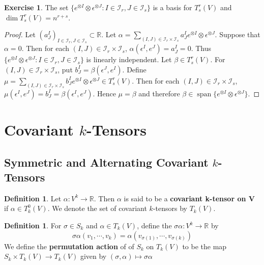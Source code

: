 \documentclass{book}
\theoremstyle{definition}
\newtheorem{defn}[definition]{Definition}
\newtheorem{ex}[definition]{Exercise}
\newcommand{\al}{\alpha}
\newcommand{\be}{\beta}
\newcommand{\ep}{\epsilon}
\newcommand{\sig}{\sigma}
\newcommand{\R}{\mathbb{R}}
\newcommand{\MI}{\mathcal{I}}
\DeclareMathOperator{\spn}{span}
\DeclareMathOperator*{\0}{\mbf{0}}
\DeclareMathOperator*{\1}{\mbf{1}}
\newcommand{\tbf}[1]{\textbf{#1}}
\begin{document}
	\begin{ex}
		The set $\{e^{\otimes I} \otimes \ep^{\otimes J}: I \in \MI_r, J \in \MI_s\}$ is a basis for $T^r_s(V)$ and $\dim T^r_s(V) = {n^{r+s}}$.
	\end{ex}

	\begin{proof}
		Let $(a^I_J)_{I \in \MI_r, J \in \MI_s} \subset \R$. Let $\al = \sum\limits_{(I,J) \in \MI_r \times \MI_s} a^I_J e^{\otimes I} \otimes  \ep^{\otimes J}$. 
		Suppose that $\al = 0$. Then for each $(I,J) \in \MI_r \times \MI_s$, $\al(\ep^I, e^J) = a^I_J = 0$. Thus $\{e^{\otimes I} \otimes \ep^{\otimes J}: I \in \MI_r, J \in \MI_s\}$ is linearly independent. Let $\be \in T^r_s(V)$. For $(I,J) \in \MI_r \times \MI_s$, put $b^I_J = \be(\ep^J, e^I)$. Define $\mu = \sum\limits_{(I,J) \in \MI_r \times \MI_s} b^I_J e^{\otimes I} \otimes \ep^{\otimes J} \in T^r_s(V)$. Then for each $(I,J) \in \MI_r \times \MI_s$, $\mu(\ep^I, e^J) = b^I_J = \be(\ep^I, e^J)$. Hence $\mu = \be$ and therefore $\be \in \spn \{e^{\otimes I} \otimes \ep^{\otimes J} \}$.
	\end{proof}		
		
		
		
		
	
	
	
	
	
	
	\newpage
	\section{Covariant $k$-Tensors}	
	
	\subsection{Symmetric and Alternating Covariant $k$-Tensors}
	
	\begin{defn}
		Let $\al: V^k \rightarrow \R$. Then $\alpha$ is said to be a \tbf{covariant k-tensor on V} if $\al \in T^0_k(V)$. We denote the set of covariant $k$-tensors by $T_k(V)$.
	\end{defn}

	\begin{defn}
		For $\sig \in S_k$ and $\al \in T_k(V)$, define the $\sig \al : V^k \rightarrow \R$ by $$\sig \al(v_1, \cdots, v_k) = \al(v_{\sig(1)}, \cdots, v_{\sig(k)})$$  
		We define the \tbf{permutation action} of of $S_k$ on $T_k(V)$ to be the map $S_k \times T_k(V) \rightarrow T_k(V)$ given by $(\sig, \al) \mapsto \sig \al$
	\end{defn}
\end{document}
